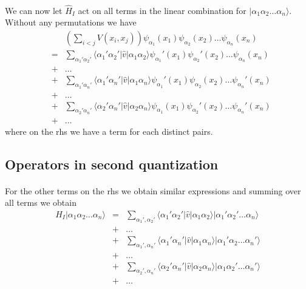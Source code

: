 \documentclass[%
twoside,                 %
final,                   %
10pt]{article}
\begin{document}
\paragraph{}
We can now let $\hat{H}_I$ act on all terms in the linear combination for $|\alpha_1\alpha_2\dots\alpha_n\rangle$. Without any permutations we have
\begin{eqnarray}
	&& \left( \sum_{i < j} V(x_i,x_j) \right) \psi_{\alpha_1}(x_1)\psi_{\alpha_2}(x_2)\dots \psi_{\alpha_n}(x_n) \nonumber \\
	&=& \sum_{\alpha_1'\alpha_2'} \langle \alpha_1'\alpha_2'|\hat{v}|\alpha_1\alpha_2\rangle
		\psi_{\alpha_1}'(x_1)\psi_{\alpha_2}'(x_2)\dots \psi_{\alpha_n}(x_n) \nonumber \\
	& +& \dots \nonumber \\
	&+& \sum_{\alpha_1'\alpha_n'} \langle \alpha_1'\alpha_n'|\hat{v}|\alpha_1\alpha_n\rangle
		\psi_{\alpha_1}'(x_1)\psi_{\alpha_2}(x_2)\dots \psi_{\alpha_n}'(x_n) \nonumber \\
	& +& \dots \nonumber \\
	&+& \sum_{\alpha_2'\alpha_n'} \langle \alpha_2'\alpha_n'|\hat{v}|\alpha_2\alpha_n\rangle
		\psi_{\alpha_1}(x_1)\psi_{\alpha_2}'(x_2)\dots \psi_{\alpha_n}'(x_n) \nonumber \\
	 & +& \dots \label{eq:2-33}
\end{eqnarray}
where on the rhs we have a term for each distinct pairs.






\subsection{Operators in second quantization}

\paragraph{}
For the other terms on the rhs we obtain similar expressions  and summing over all terms we obtain
\begin{eqnarray}
	H_I |\alpha_1\alpha_2\dots\alpha_n\rangle &=& \sum_{\alpha_1', \alpha_2'} \langle \alpha_1'\alpha_2'|\hat{v}|\alpha_1\alpha_2\rangle
		|\alpha_1'\alpha_2'\dots\alpha_n\rangle \nonumber \\
	&+& \dots \nonumber \\
	&+& \sum_{\alpha_1', \alpha_n'} \langle \alpha_1'\alpha_n'|\hat{v}|\alpha_1\alpha_n\rangle
		|\alpha_1'\alpha_2\dots\alpha_n'\rangle \nonumber \\
	&+& \dots \nonumber \\
	&+& \sum_{\alpha_2', \alpha_n'} \langle \alpha_2'\alpha_n'|\hat{v}|\alpha_2\alpha_n\rangle
		|\alpha_1\alpha_2'\dots\alpha_n'\rangle \nonumber \\
	 &+& \dots \label{eq:2-34}
\end{eqnarray}
\end{document}
